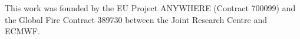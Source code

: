 \documentclass[, manuscript]{copernicus}
\begin{document}





\begin{acknowledgements}
This work was founded by the EU Project ANYWHERE (Contract 700099) and
the Global Fire Contract 389730 between the Joint Research Centre and
ECMWF.
\end{acknowledgements}







\end{document}
